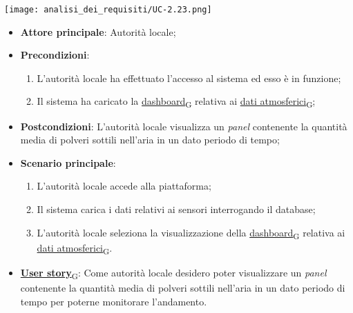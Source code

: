 \begin{center}
	\texttt{[image: analisi\_dei\_requisiti/UC-2.23.png]}
\end{center}

\begin{itemize}
	\item \textbf{Attore principale}: Autorità locale;
	\item \textbf{Precondizioni}:
	      \begin{enumerate}
		      \item L'autorità locale ha effettuato l'accesso al sistema ed esso è in funzione;
		      \item Il sistema ha caricato la \href{https://7last.github.io/docs/rtb/documentazione-interna/glossario\#dashboard}{dashboard\textsubscript{G}} relativa ai \href{https://7last.github.io/docs/rtb/documentazione-interna/glossario\#dati-atmosferici}{dati atmosferici\textsubscript{G}};
	      \end{enumerate}
	\item \textbf{Postcondizioni}: L'autorità locale visualizza un \textit{panel} contenente la quantità media di polveri sottili nell'aria
	      in un dato periodo di tempo;
	\item \textbf{Scenario principale}:
	      \begin{enumerate}
		      \item L'autorità locale accede alla piattaforma;
		      \item Il sistema carica i dati relativi ai sensori interrogando il database;
		      \item L'autorità locale seleziona la visualizzazione della \href{https://7last.github.io/docs/rtb/documentazione-interna/glossario\#dashboard}{dashboard\textsubscript{G}} relativa ai \href{https://7last.github.io/docs/rtb/documentazione-interna/glossario\#dati-atmosferici}{dati atmosferici\textsubscript{G}}.
	      \end{enumerate}
	\item \href{https://7last.github.io/docs/rtb/documentazione-interna/glossario\#user-story}{\textbf{User story}\textsubscript{G}}: Come autorità locale desidero poter visualizzare un \textit{panel} contenente la quantità media di polveri sottili nell'aria
	      in un dato periodo di tempo per poterne monitorare l'andamento.
\end{itemize}

